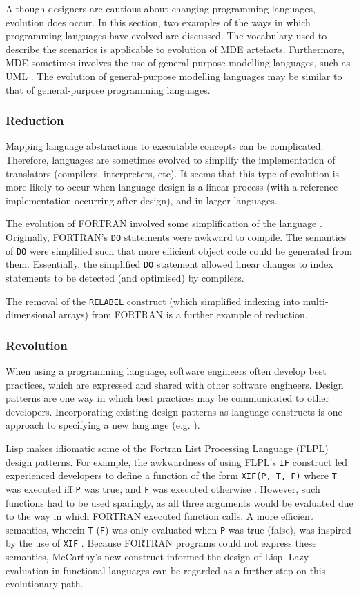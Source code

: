 Although designers are cautious about changing programming languages, evolution does occur. In this section, two examples of the ways in which programming languages have evolved are discussed. The vocabulary used to describe the scenarios is applicable to evolution of MDE artefacts. Furthermore, MDE sometimes involves the use of general-purpose modelling languages, such as UML \cite{uml212}. The evolution of general-purpose modelling languages may be similar to that of general-purpose programming languages.

\subsubsection{Reduction}
Mapping language abstractions to executable concepts can be complicated. Therefore, languages are sometimes evolved to simplify the implementation of translators (compilers, interpreters, etc). It seems that this type of evolution is more likely to occur when language design is a linear process (with a reference implementation occurring after design), and in larger languages.

The \cc evolution of FORTRAN involved some simplification of the language \cite{backus78history}. Originally, FORTRAN's \verb|DO| statements were awkward to compile. The semantics of \verb|DO| were simplified such that more efficient object code could be generated from them. Essentially, the simplified \verb|DO| statement allowed linear changes to index statements to be detected (and optimised) by compilers.

The removal of the \verb|RELABEL| construct (which simplified indexing into multi-dimensional arrays) from FORTRAN \cite{backus78history} is a further example of reduction.

\subsubsection{Revolution}
When using a programming language, software engineers often develop best practices, which are expressed and shared with other software engineers. Design patterns are one way in which best practices may be communicated to other developers. Incorporating existing design patterns as language constructs is one approach to specifying a new language (e.g. \cite{bosch98patterns}).

Lisp makes idiomatic some of the Fortran List Processing Language (FLPL) design patterns. For \cc example, the awkwardness of using FLPL's \verb|IF| construct led experienced developers to define a function of the form \verb|XIF(P, T, F)| where \verb|T| was executed iff \verb|P| was true, and \verb|F| was executed otherwise \cite{mcarthy78lisp}. However, such functions had to be used sparingly, as all three arguments would be evaluated due to the way in which FORTRAN executed function calls.   A more efficient semantics, wherein \verb|T| (\verb|F|) was only evaluated when  \verb|P| was true (false), was inspired by the use of \verb|XIF| \cite{mcarthy78lisp}. Because FORTRAN programs could not express these semantics, McCarthy's new construct informed the design of Lisp. Lazy evaluation in functional languages can be regarded as a further step on this evolutionary path.


